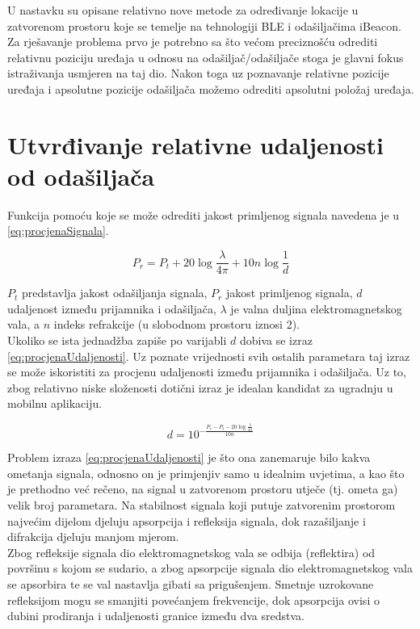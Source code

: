 U nastavku su opisane relativno nove metode za određivanje lokacije u zatvorenom prostoru koje se temelje na tehnologiji BLE i odašiljačima iBeacon.
Za rješavanje problema prvo je potrebno sa što većom preciznošću odrediti relativnu poziciju uređaja u odnosu na odašiljač/odašiljače stoga je glavni fokus istraživanja usmjeren na taj dio. 
Nakon toga uz poznavanje relativne pozicije uređaja i apsolutne pozicije odašiljača možemo odrediti apsolutni položaj uređaja.

\section{Utvrđivanje relativne udaljenosti od odašiljača}

Funkcija pomoću koje se može odrediti jakost primljenog signala navedena je u \eqref{eq:procjenaSignala}.

\begin{equation}
	\label{eq:procjenaSignala}
	P_r = P_t + 20\log{\frac{\lambda}{4\pi}} + 10n\log{\frac{1}{d}}
\end{equation}

$P_t$ predstavlja jakost odašiljanja signala, $P_r$ jakost primljenog signala, $d$ udaljenost između prijamnika i odašiljača, $\lambda$ je valna duljina elektromagnetskog vala, a $n$ indeks refrakcije (u slobodnom prostoru iznosi 2).
\\

Ukoliko se ista jednadžba zapiše po varijabli $d$ dobiva se izraz \eqref{eq:procjenaUdaljenosti}. 
Uz poznate vrijednosti svih ostalih parametara taj izraz se može iskoristiti za procjenu udaljenosti između prijamnika i odašiljača.
Uz to, zbog relativno niske složenosti dotični izraz je idealan kandidat za ugradnju u mobilnu aplikaciju.

\begin{equation}
	\label{eq:procjenaUdaljenosti}
	d = 10^{-\frac{P_r - P_t - 20\log{\frac{\lambda}{4\pi}}}{10n}}
\end{equation}

Problem izraza \eqref{eq:procjenaUdaljenosti} je što ona zanemaruje bilo kakva ometanja signala, odnosno on je primjenjiv samo u idealnim uvjetima, a kao što je prethodno već rečeno, na signal u zatvorenom prostoru utječe (tj. ometa ga) velik broj parametara. 
Na stabilnost signala koji putuje zatvorenim prostorom najvećim dijelom djeluju apsorpcija i refleksija signala, dok razašiljanje i difrakcija djeluju manjom mjerom.
\\
Zbog refleksije signala dio elektromagnetskog vala se odbija (reflektira) od površinu s kojom se sudario, a zbog apsorpcije signala dio elektromagnetskog vala se apsorbira te se val nastavlja gibati sa prigušenjem. 
Smetnje uzrokovane refleksijom mogu se smanjiti povećanjem frekvencije, dok apsorpcija ovisi o dubini prodiranja i udaljenosti granice između dva sredstva. %
\\

